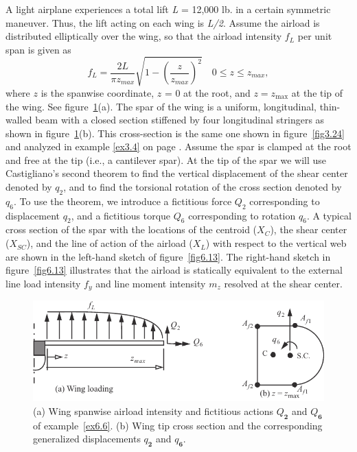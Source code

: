 \documentclass{AeroStructure-ERJohnson}
\begin{document}
\begin{example*}\label{ex6.6}A light airplane experiences a total lift \textit{L} = 12,000 lb. in a certain symmetric maneuver. Thus, the lift acting on each wing is \textit{L/2}. Assume the airload is distributed elliptically over the wing, so that the airload intensity $f_{L}$ per unit span is given as
\begin{equation*}
f_{L}=\frac{2 L}{\pi z_{m a x}} \sqrt{1-\left(\frac{z}{z_{m a x}}\right)^{2}} \quad 0 \leq z \leq z_{\textit{max}},\tag{a}
\end{equation*}
where $z$ is the spanwise coordinate, $z$ = 0 at the root, and $z=z_{\max }$ at the tip of the wing. See figure~\ref{fig6.12}(a). The spar of the wing is a uniform, longitudinal, thin-walled beam with a closed section stiffened by four longitudinal stringers as shown in figure~\ref{fig6.12}(b). This cross-section is the same one shown in figure~\ref{fig3.24} and analyzed in example \ref{ex3.4} on page \pageref{ex3.4}. Assume the spar is clamped at the root and free at the tip (i.e., a cantilever spar). At the tip of the spar we will use Castigliano's second theorem to find the vertical displacement of the shear center denoted by $q_2$, and to find the torsional rotation of the cross section denoted by $q_6$. To use the theorem, we introduce a fictitious force $Q_2$ corresponding to displacement $q_2$, and a fictitious torque $Q_6$ corresponding to rotation $q_6$. A typical cross section of the spar with the locations of the centroid ($X_C$), the shear center ($X_{SC}$), and the line of action of the airload ($X_L$) with respect to the vertical web are shown in the left-hand sketch of figure~\ref{fig6.13}. The right-hand sketch in figure~\ref{fig6.13} illustrates that the airload is statically equivalent to the external line load intensity $f_{y}$ and line moment intensity $m_{z}$ resolved at the shear center.

\begin{figure}[!h]
\centerline{\includegraphics{Figure_6-12.pdf}}
\caption{(a) Wing spanwise airload intensity and fictitious actions $Q_{\textbf{2}}$ and $Q_{\textbf{6}}$ of example~\ref{ex6.6}. (b) Wing tip cross section and the corresponding generalized displacements $q_{\textbf{2}}$ and $q_{\textbf{6}}$.}\label{fig6.12}
\end{figure}




\end{example*}
\end{document}
